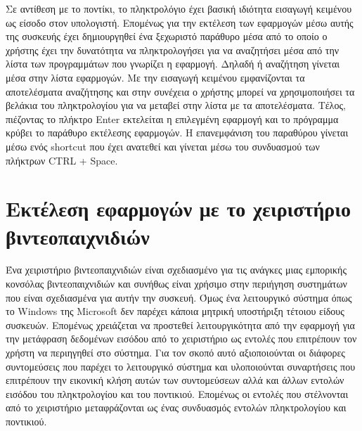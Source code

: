 Σε αντίθεση με το ποντίκι, το πληκτρολόγιο έχει βασική ιδιότητα εισαγωγή κειμένου ως είσοδο στον
υπολογιστή. Επομένως για την εκτέλεση των εφαρμογών μέσω αυτής της συσκευής έχει δημιουργηθεί 
ένα ξεχωριστό παράθυρο μέσα από το οποίο ο χρήστης έχει την δυνατότητα να πληκτρολογήσει για
να αναζητήσει μέσα από την λίστα των προγραμμάτων που γνωρίζει η εφαρμογή. Δηλαδή ή αναζήτηση
γίνεται μέσα στην λίστα εφαρμογών. Με την εισαγωγή κειμένου εμφανίζονται τα αποτελέσματα
αναζήτησης και στην συνέχεια ο χρήστης μπορεί να χρησιμοποιήσει τα βελάκια του πληκτρολογίου
για να μεταβεί στην λίστα με τα αποτελέσματα. Τέλος, πιέζοντας το πλήκτρο Enter εκτελείται η
επιλεγμένη εφαρμογή και το πρόγραμμα κρύβει το παράθυρο εκτέλεσης εφαρμογών. Η επανεμφάνιση του
παραθύρου γίνεται μέσω ενός shortcut που έχει ανατεθεί και γίνεται μέσω του συνδυασμού των πλήκτρων
CTRL + Space. 

\section{Εκτέλεση εφαρμογών με το χειριστήριο βιντεοπαιχνιδιών}

Ένα χειριστήριο βιντεοπαιχνιδιών είναι σχεδιασμένο για τις ανάγκες μιας εμπορικής κονσόλας
βιντεοπαιχνιδιών και συνήθως είναι χρήσιμο στην περιήγηση συστημάτων που είναι σχεδιασμένα
για αυτήν την συσκευή. Όμως ένα λειτουργικό σύστημα όπως το Windows της Microsoft δεν
παρέχει κάποια μητρική υποστήριξη τέτοιου είδους συσκευών. Επομένως χρειάζεται να προστεθεί
λειτουργικότητα από την εφαρμογή για την μετάφραση δεδομένων εισόδου από το χειριστήριο ως
εντολές που επιτρέπουν τον χρήστη να περιηγηθεί στο σύστημα. Για τον σκοπό αυτό αξιοποιούνται
οι διάφορες συντομεύσεις που παρέχει το λειτουργικό σύστημα και υλοποιούνται συναρτήσεις που
επιτρέπουν την εικονική κλήση αυτών των συντομεύσεων αλλά και άλλων εντολών εισόδου του
πληκτρολογίου και του ποντικιού. Επομένως οι εντολές που στέλνονται από το χειριστήριο μεταφράζονται
ως ένας συνδυασμός εντολών πληκτρολογίου και ποντικιού. 